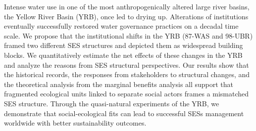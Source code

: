 
Intense water use in one of the most anthropogenically altered large river basins, the Yellow River Basin (YRB), once led to drying up.
Alterations of institutions eventually successfully restored water governance practices on a decadal time scale.
We propose that the institutional shifts in the YRB (87-WAS and 98-UBR) framed two different SES structures and depicted them as widespread building blocks.
We quantitatively estimate the net effects of these changes in the YRB and analyze the reasons from SES structural perspectives.
Our results show that the historical records, the responses from stakeholders to structural changes, and the theoretical analysis from the marginal benefits analysis all support that fragmented ecological units linked to separate social actors frames a mismatched SES structure.
Through the quasi-natural experiments of the YRB, we demonstrate that social-ecological fits can lead to successful SESs management worldwide with better sustainability outcomes.
